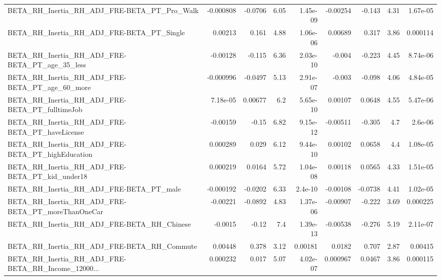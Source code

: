 \begin{tabular}{lrrrrrrrr}
BETA\_RH\_Inertia\_RH\_ADJ\_FRE-BETA\_PT\_Pro\_Walk        &   -0.000808 &      -0.0706 &     6.05 & 1.45e-09 &   -0.00254 &      -0.143 &         4.31 &      1.67e-05 \\
BETA\_RH\_Inertia\_RH\_ADJ\_FRE-BETA\_PT\_Single          &     0.00213 &        0.161 &     4.88 & 1.06e-06 &    0.00689 &       0.317 &         3.86 &      0.000114 \\
BETA\_RH\_Inertia\_RH\_ADJ\_FRE-BETA\_PT\_age\_35\_less     &    -0.00128 &       -0.115 &     6.36 & 2.03e-10 &     -0.004 &      -0.223 &         4.45 &      8.74e-06 \\
BETA\_RH\_Inertia\_RH\_ADJ\_FRE-BETA\_PT\_age\_60\_more     &   -0.000996 &      -0.0497 &     5.13 & 2.91e-07 &     -0.003 &      -0.098 &         4.06 &      4.84e-05 \\
BETA\_RH\_Inertia\_RH\_ADJ\_FRE-BETA\_PT\_fulltimeJob     &    7.18e-05 &      0.00677 &      6.2 & 5.65e-10 &    0.00107 &      0.0648 &         4.55 &      5.47e-06 \\
BETA\_RH\_Inertia\_RH\_ADJ\_FRE-BETA\_PT\_haveLicense     &    -0.00159 &        -0.15 &     6.82 & 9.15e-12 &   -0.00511 &      -0.305 &          4.7 &       2.6e-06 \\
BETA\_RH\_Inertia\_RH\_ADJ\_FRE-BETA\_PT\_highEducation   &    0.000289 &        0.029 &     6.12 & 9.44e-10 &    0.00102 &      0.0658 &          4.4 &      1.08e-05 \\
BETA\_RH\_Inertia\_RH\_ADJ\_FRE-BETA\_PT\_kid\_under18     &    0.000219 &       0.0164 &     5.72 & 1.04e-08 &    0.00118 &      0.0565 &         4.33 &      1.51e-05 \\
BETA\_RH\_Inertia\_RH\_ADJ\_FRE-BETA\_PT\_male            &   -0.000192 &      -0.0202 &     6.33 &  2.4e-10 &   -0.00108 &     -0.0738 &         4.41 &      1.02e-05 \\
BETA\_RH\_Inertia\_RH\_ADJ\_FRE-BETA\_PT\_moreThanOneCar  &    -0.00221 &      -0.0892 &     4.83 & 1.37e-06 &   -0.00907 &      -0.222 &         3.69 &      0.000225 \\
BETA\_RH\_Inertia\_RH\_ADJ\_FRE-BETA\_RH\_Chinese         &     -0.0015 &        -0.12 &      7.4 & 1.39e-13 &   -0.00538 &      -0.276 &         5.19 &      2.11e-07 \\
BETA\_RH\_Inertia\_RH\_ADJ\_FRE-BETA\_RH\_Commute         &     0.00448 &        0.378 &     3.12 &  0.00181 &     0.0182 &       0.707 &         2.87 &       0.00415 \\
BETA\_RH\_Inertia\_RH\_ADJ\_FRE-BETA\_RH\_Income\_12000... &    0.000232 &        0.017 &     5.07 & 4.02e-07 &   0.000967 &      0.0467 &         3.86 &      0.000115 \\

\end{tabular}
